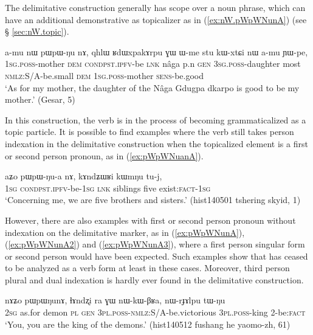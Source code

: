 The delimitative construction generally has scope over a noun phrase, which can have an additional demonstrative  as topicalizer as in (\ref{ex:nW.pWpWNunA}) (see § \ref{sec:nW.topic}).

\begin{exe}
\ex \label{ex:nW.pWpWNunA}
\gll a-mu nɯ pɯ\redp{}pɯ-ŋu nɤ, qhlɯ ʁdɯxpakɤrpu ɣɯ ɯ-me stu kɯ-xtɕi nɯ a-mu ɲɯ-pe, \\
\textsc{1sg}.\textsc{poss}-mother \textsc{dem} \textsc{cond}\redp{}\textsc{pst.ipfv}-be \textsc{lnk} nâga p.n \textsc{gen} \textsc{3sg}.\textsc{poss}-daughter most \textsc{nmlz}:S/A-be.small \textsc{dem} \textsc{1sg}.\textsc{poss}-mother \textsc{sens}-be.good \\
\glt `As for my mother, the daughter of the Nâga Gdugpa dkarpo is good to be my mother.' (Gesar, 5)
\end{exe}

In this construction, the verb is in the process of becoming grammaticalized as a topic particle. It is possible to find examples where the verb still takes person indexation in the delimitative construction when the topicalized element is a first or second person pronoun, as in (\ref{ex:pWpWNuanA}). 

\begin{exe}
\ex \label{ex:pWpWNuanA}
\gll aʑo pɯ\redp{}pɯ-ŋu-a nɤ, kɤndʑɯʁi kɯmŋu tu-j, \\
\textsc{1sg} \textsc{cond}\redp{}\textsc{pst.ipfv}-be-\textsc{1sg} \textsc{lnk} siblings five exist:\textsc{fact}-\textsc{1sg} \\
\glt `Concerning me, we are five brothers and sisters.' (hist140501 tshering skyid, 1)
\end{exe}

However, there are also examples with first or second person pronoun without indexation on the delimitative marker, as in (\ref{ex:pWpWNunA}), (\ref{ex:pWpWNunA2}) and (\ref{ex:pWpWNunA3}), where a first person singular form  or second person  would have been expected. Such examples show that  has ceased to be analyzed as a verb form at least in these cases. Moreover, third person plural and dual indexation is hardly ever found in the delimitative construction.

\begin{exe}
\ex \label{ex:pWpWNunA}
\gll nɤʑo pɯpɯŋunɤ, ɬɤndʐi ra ɣɯ nɯ-kɯ-βʁa, nɯ-rɟɤlpu tɯ-ŋu \\
\textsc{2sg} as.for demon \textsc{pl} \textsc{gen} \textsc{3pl.poss}-\textsc{nmlz}:S/A-be.victorious \textsc{3pl.poss}-king 2-be:\textsc{fact} \\
\glt `You, you are the king of the demons.' (hist140512 fushang he yaomo-zh, 61)
\end{exe}

